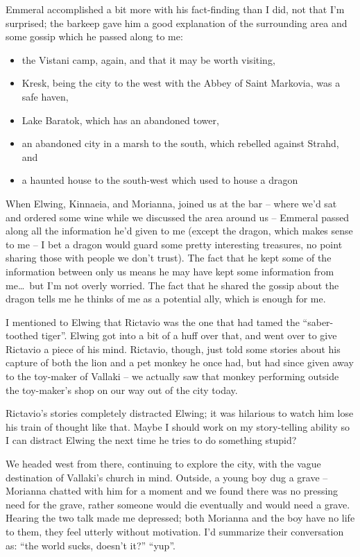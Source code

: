 Emmeral accomplished a bit more with his fact-finding than I did, not that I'm surprised; the barkeep gave him a good explanation of the surrounding area and some gossip which he passed along to me:
\begin{itemize}
\item the Vistani camp, again, and that it may be worth visiting,
\item Kresk, being the city to the west with the Abbey of Saint Markovia, was a safe haven,
\item Lake Baratok, which has an abandoned tower,
\item an abandoned city in a marsh to the south, which rebelled against Strahd, and
\item a haunted house to the south-west which used to house a dragon
\end{itemize}

When Elwing, Kinnaeia, and Morianna, joined us at the bar -- where we'd sat and ordered some wine while we discussed the area around us -- Emmeral passed along all the information he'd given to me (except the dragon, which makes sense to me -- I bet a dragon would guard some pretty interesting treasures, no point sharing those with people we don't trust). The fact that he kept some of the information between only us means he may have kept some information from me\dots\ but I'm not overly worried. The fact that he shared the gossip about the dragon tells me he thinks of me as a potential ally, which is enough for me.

I mentioned to Elwing that Rictavio was the one that had tamed the ``saber-toothed tiger''. Elwing got into a bit of a huff over that, and went over to give Rictavio a piece of his mind. Rictavio, though, just told some stories about his capture of both the lion and a pet monkey he once had, but had since given away to the toy-maker of Vallaki -- we actually saw that monkey performing outside the toy-maker's shop on our way out of the city today.

Rictavio's stories completely distracted Elwing; it was hilarious to watch him lose his train of thought like that. Maybe I should work on my story-telling ability so I can distract Elwing the next time he tries to do something stupid?

We headed west from there, continuing to explore the city, with the vague destination of Vallaki's church in mind. Outside, a young boy dug a grave -- Morianna chatted with him for a moment and we found there was no pressing need for the grave, rather someone would die eventually and would need a grave. Hearing the two talk made me depressed; both Morianna and the boy have no life to them, they feel utterly without motivation. I'd summarize their conversation as: ``the world sucks, doesn't it?'' ``yup''.

